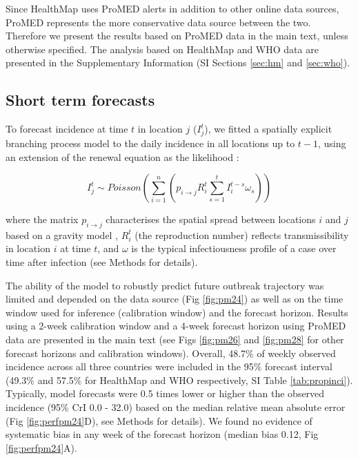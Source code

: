 \documentclass[9pt,twocolumn,twoside,lineno]{pnas-new}
\begin{document}
Since HealthMap uses ProMED alerts in addition to other online data
sources, ProMED represents the more conservative data source between the
two. Therefore we present the results based on ProMED data in the main
text, unless otherwise specified. The analysis based on HealthMap and
WHO data are presented in the
Supplementary Information (SI Sections \ref{sec:hm}
and \ref{sec:who}).


\subsection*{Short term forecasts}\label{short-term-forecasts}

To forecast incidence at time \(t\) in location \(j\) (\(I_{j}^{t}\)),
we fitted a spatially explicit branching process model to the daily
incidence in all locations up to \(t - 1\), using an extension of the
renewal equation as the likelihood \cite{fraser2007estimating}:

\begin{equation}
I_{j}^{t} \sim Poisson\left(\sum_{i = 1}^n\left({p_{i \rightarrow j} R_{i}^{t}
\sum_{s = 1}^t{I_{i}^{t - s} \omega_s}}\right)\right)
\label{eq:model}
\end{equation}

where the matrix \(p_{i \rightarrow j}\) characterises the spatial
spread between locations \(i\) and \(j\) based on a gravity model
\cite{zipf1946p}, \(R_{i}^{t}\) (the reproduction number) reflects
transmissibility in location \(i\) at time \(t\), and \(\omega\) is the
typical infectiousness profile of a case over time after infection (see
Methods for details).

The ability of the model to robustly predict future outbreak
trajectory was limited and depended on the data source (Fig \ref{fig:pm24})
as well as on the time window used for inference (calibration window)
and the forecast horizon. Results using a 2-week calibration window
and a 4-week forecast horizon using ProMED data are presented in
the main text (see Figs \ref{fig:pm26} and \ref{fig:pm28} for other 
forecast horizons and calibration windows).
Overall, 48.7\% of weekly observed incidence across
all three countries were included in the 95\%
forecast interval (49.3\% and 57.5\% for HealthMap and WHO
respectively, SI Table \ref{tab:propinci}).
Typically, model forecasts were 0.5 times lower or higher
than the observed incidence (95\% CrI 0.0 - 32.0) based on the 
median relative mean absolute
error (Fig \ref{fig:perfpm24}D), see Methods for details). We found no evidence of
systematic bias in any week of the forecast horizon (median bias 0.12,
Fig \ref{fig:perfpm24}A).
\end{document}
